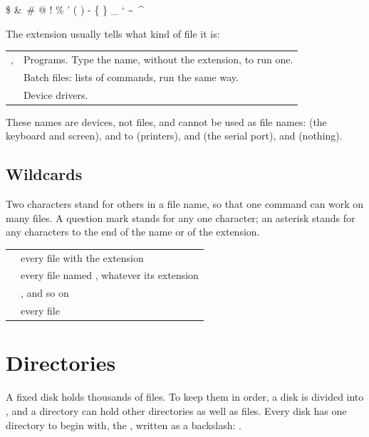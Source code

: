 \begin{dialogue}
\$ \&\ \# @ ! \% ' ( ) - \{ \} \_ ` \textasciitilde\ \textasciicircum
\end{dialogue}

The extension usually tells what kind of file it is:

\begin{tabularx}{\textwidth}{@{}P{1.1in}X@{}}
\toprule
{},  & Programs. Type the name, without the extension, to run one.\\
 & Batch files: lists of commands, run the same way.\\
 & Device drivers.\\
\bottomrule
\end{tabularx}

These names are devices, not files, and cannot be used as file names:
 (the keyboard and screen),  and  to
 (printers),  and  (the serial port), and
 (nothing).

\subsection{Wildcards} Two characters stand for others in a
file name, so that one command can work on many files. A question mark
 stands for any one character; an asterisk \typed{*} stands for
any characters to the end of the name or of the extension.

\begin{tabularx}{\textwidth}{@{}P{1.3in}X@{}}
\toprule
{} & every file with the extension \\
 & every file named , whatever its extension\\
 & ,  and so on\\
 & every file\\
\bottomrule
\end{tabularx}

\section{Directories}

A fixed disk holds thousands of files. To keep them in order, a disk is
divided into , and a directory can hold other
directories as well as files. Every disk has one directory to begin with,
the , written as a backslash: .

